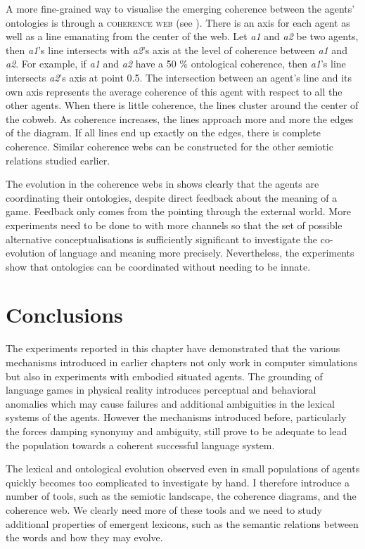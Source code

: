 A more fine-grained way to visualise the emerging
coherence between the agents' ontologies is 
through a {\scshape coherence web} (see ). 
There is an axis for each agent as well as
a line emanating from the center of the web.
Let \emph{a1} and \emph{a2} be two 
agents, then \emph{a1}'s line intersects with \emph{a2}'s axis at the 
level of coherence between \emph{a1} and \emph{a2}. For example, if \emph{a1}
and \emph{a2} have a 50 \% ontological coherence, then \emph{a1}'s
line intersects \emph{a2}'s axis at point 0.5. The intersection between 
an agent's line and its own axis represents the average 
coherence of this agent with respect to all the other
agents. When there is little 
coherence, the lines cluster around the center of the cobweb. 
As coherence increases, the lines approach more and more the edges
of the diagram. If all lines end up exactly
on the edges, there is complete coherence. Similar coherence
webs can be constructed for the other semiotic 
relations studied earlier.  

The evolution in the coherence webs in  shows clearly that the agents are 
coordinating their ontologies, despite direct feedback 
about the meaning of a game. Feedback only comes from 
the pointing through the external world. More experiments
need to be done to with more channels so that the 
set of possible alternative conceptualisations is 
sufficiently significant to investigate the co-evolution 
of language and meaning more precisely. Nevertheless, 
the experiments show that ontologies can be coordinated
without needing to be innate. 

\section{Conclusions} \enlargethispage{1\baselineskip}

The experiments reported in this chapter have
demonstrated that 
the various mechanisms introduced in earlier chapters
not only work in computer simulations but also in 
experiments with embodied situated agents. 
The grounding of language games in physical 
reality introduces perceptual and behavioral anomalies 
which may cause failures and additional ambiguities
in the lexical systems of the agents. However the 
mechanisms introduced before, particularly the 
forces damping synonymy and ambiguity, still prove to 
be adequate to lead the population towards a 
coherent successful language system. 

The lexical and ontological evolution observed even 
in small populations of agents quickly becomes 
too complicated to investigate by hand. I therefore
introduce a number of tools, such as the semiotic
landscape, the coherence diagrams, and the coherence
web. We clearly need more of these tools and we 
need to study additional properties of emergent 
lexicons, such as the semantic relations between 
the words and how they may evolve. 

